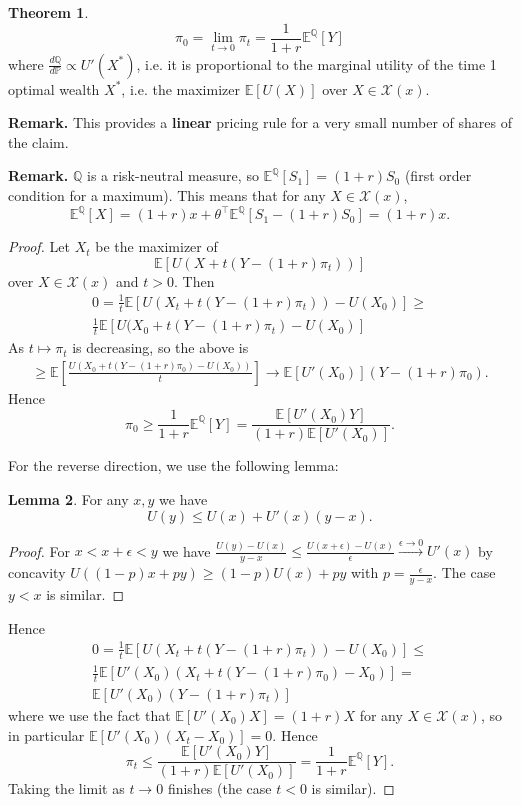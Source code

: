 \documentclass{article}
\theoremstyle{definition}
\newtheorem{theorem}{Theorem}[section]
\newtheorem{lemma}[theorem]{Lemma}
\begin{document}
\begin{theorem}
    $$\pi_0 = \lim_{t \to 0}\pi_t = \frac{1}{1+r}\mathbb{E}^{\mathbb{Q}}[Y]$$ where $\frac{d \mathbb{Q}}{d \mathbb{P}} \propto U'(X^*)$, i.e. it is proportional to the marginal utility of the time 1 optimal wealth $X^*$, i.e. the maximizer $\mathbb{E}[U(X)]$ over $X \in \mathcal{X}(x)$. 
\end{theorem}
\textbf{Remark.} This provides a \textbf{linear} pricing rule for a very small number of shares of the claim.

\textbf{Remark.} $\mathbb{Q}$ is a risk-neutral measure, so $\mathbb{E}^{\mathbb{Q}}[S_1] = (1+r)S_0$ (first order condition for a maximum). This means that for any $X \in \mathcal{X}(x)$, $$\mathbb{E}^{\mathbb{Q}}[X] = (1+r)x + \theta^\top\mathbb{E}^{\mathbb{Q}}[S_1-(1+r)S_0] = (1+r)x.$$

\begin{proof}
    Let $X_t$ be the maximizer of $$\mathbb{E}[U(X+t(Y-(1+r)\pi_t))]$$ over $X \in \mathcal{X}(x)$ and $t>0$. Then
    \begin{align*}
        0 = \frac{1}{t}\mathbb{E}\left[U(X_t+t(Y-(1+r)\pi_t)) - U(X_0)\right] \ge \\
        \frac{1}{t}\mathbb{E}[U(X_0+t(Y-(1+r)\pi_t)-U(X_0)]
    \end{align*}
    As $t \mapsto \pi_t$ is decreasing, so the above is 
    \begin{align*}
        \ge \mathbb{E}\left[\frac{U(X_0+t(Y-(1+r)\pi_0)-U(X_0))}{t}\right] \to \mathbb{E}[U'(X_0)](Y-(1+r)\pi_0).
    \end{align*}
    Hence $$\pi_0 \ge \frac{1}{1+r}\mathbb{E}^{\mathbb{Q}}[Y] = \frac{\mathbb{E}[U'(X_0)Y]}{(1+r)\mathbb{E}[U'(X_0)]}.$$

    
    For the reverse direction, we use the following lemma:
    \begin{lemma}
        For any $x,y$ we have \[
        U(y) \le U(x) + U'(x)(y-x).
        \]
    \end{lemma}
    \begin{proof}
        For $x<x+\epsilon<y$ we have $\frac{U(y)-U(x)}{y-x}\le \frac{U(x+\epsilon)-U(x)}{\epsilon} \stackrel{\epsilon \to 0}{\to} U'(x)$ by concavity $U((1-p)x+py) \ge (1-p)U(x)+py$ with $p=\frac{\epsilon}{y-x}$. The case $y<x$ is similar.
    \end{proof}

    Hence
    \begin{align*}
        0 = \frac{1}{t}\mathbb{E}[U(X_t+ t(Y-(1+r)\pi_t))-U(X_0)] \le\\
        \frac{1}{t}\mathbb{E}[U'(X_0)(X_t+t(Y-(1+r)\pi_0)-X_0)] = \\
        \mathbb{E}[U'(X_0)(Y-(1+r)\pi_t)]
    \end{align*}
    where we use the fact that $\mathbb{E}[U'(X_0)X]=(1+r)X$ for any $X \in \mathcal{X}(x)$, so in particular $\mathbb{E}[U'(X_0)(X_t-X_0)]=0$. Hence
    \[
    \pi_t \le \frac{\mathbb{E}[U'(X_0)Y]}{(1+r)\mathbb{E}[U'(X_0)]} = \frac{1}{1+r}\mathbb{E}^{\mathbb{Q}}[Y].
    \]
    Taking the limit as $t \to 0$ finishes (the case $t<0$ is similar).
\end{proof}
\end{document}

